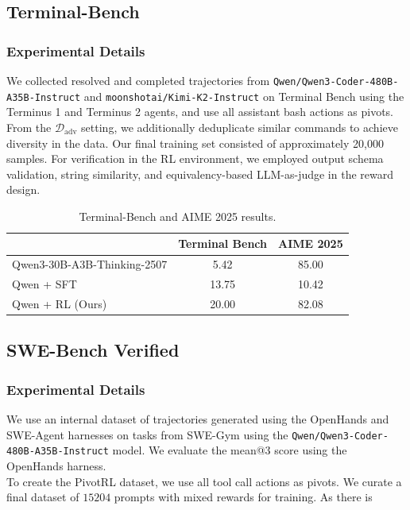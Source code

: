 \subsection{Terminal-Bench}
\subsubsection{Experimental Details}
We collected resolved and completed trajectories from \texttt{Qwen/Qwen3-Coder-480B-A35B-Instruct} and \texttt{moonshotai/Kimi-K2-Instruct} on Terminal Bench using the Terminus 1 and Terminus 2 agents, and use all assistant bash actions as pivots. From the $\mathcal{D}_{\text{adv}}$ setting, we additionally deduplicate similar commands to achieve diversity in the data. Our final training set consisted of approximately 20,000 samples. For verification in the RL environment, we employed output schema validation, string similarity, and equivalency-based LLM-as-judge in the reward design.

\begin{table}[t]
\small
\centering
\setlength{\tabcolsep}{6pt}
\begin{tabular}{lcc}
\toprule
& \textbf{Terminal Bench} & \textbf{AIME 2025} \\
\midrule
Qwen3-30B-A3B-Thinking-2507 & 5.42 & 85.00 \\
\midrule
Qwen + SFT                  & 13.75 & 10.42 \\
Qwen + RL (Ours)            & 20.00 & 82.08 \\
\bottomrule
\end{tabular}
\caption{Terminal-Bench and AIME 2025 results.}
\label{table:results_terminal}
\end{table}

\subsection{SWE-Bench Verified}
\subsubsection{Experimental Details}
We use an internal dataset of trajectories generated using the OpenHands \citep{wang2025openhandsopenplatformai} and SWE-Agent \citep{yang2024sweagentagentcomputerinterfacesenable} harnesses on tasks from SWE-Gym \citep{pan2025trainingsoftwareengineeringagents} using the \texttt{Qwen/Qwen3-Coder-480B-A35B-Instruct} \citep{qwen3technicalreport} model. We evaluate the mean@3 score using the OpenHands harness. \\
To create the PivotRL dataset, we use all tool call actions as pivots. We curate a final dataset of $15204$ prompts with mixed rewards for training. As there is 


